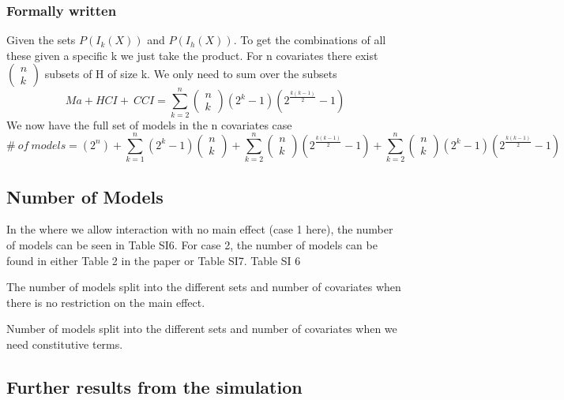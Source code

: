 \subsubsection{Formally written}

Given the sets $P\left(I_k\left(X\right)\right)$ and $P\left(I_h\left(X\right)\right)$. To get the combinations of all these given a specific k we just take the product. For n covariates there exist $\left( \begin{array}{c}
n \\ 
k \end{array}
\right)$ subsets of H of size k. We only need to sum over the subsets
\[Ma+HCI+\ CCI=\sum^n_{k=2}{\left( \begin{array}{c}
n \\ 
k \end{array}
\right)\left(2^k-1\right)\left(2^{\frac{k\left(k-1\right)}{2}}-1\right)}\] 
We now have the full set of models in the n covariates case
\[\#\ of\ models=\left(2^n\right)+\sum^n_{k=1}{\left(2^k-1\right)\left( \begin{array}{c}
n \\ 
k \end{array}
\right)}+\sum^n_{k=2}{\left( \begin{array}{c}
n \\ 
k \end{array}
\right)\left(2^{\frac{k\left(k-1\right)}{2}}-1\right)}+\sum^n_{k=2}{\left( \begin{array}{c}
n \\ 
k \end{array}
\right)\left(2^k-1\right)\left(2^{\frac{k\left(k-1\right)}{2}}-1\right)}\] 
\subsection{Number of Models}

\noindent In the where we allow interaction with no main effect (case 1 here), the number of models can be seen in Table SI6. For case 2, the number of models can be found in either Table 2 in the paper or Table SI7. Table SI 6





\noindent The number of models split into the different sets and number of covariates when there is no restriction on the main effect.





\noindent Number of models split into the different sets and number of covariates when we need constitutive terms.




\subsection{Further results from the simulation}
